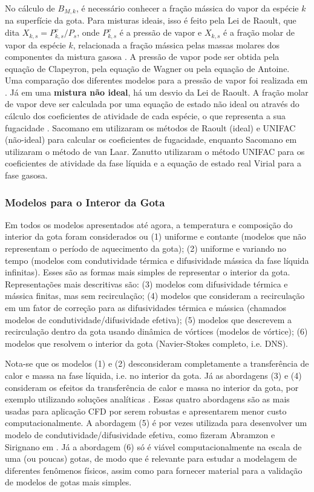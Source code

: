 No cálculo de $B_{M,k}$, é necessário conhecer a fração mássica do vapor da espécie $k$ na superfície da gota.
Para misturas ideais, isso é feito pela Lei de Raoult, que dita $X_{k,s}=P^v_{k,s}/P_s$, onde $P^v_{k,s}$ é a pressão de vapor e $X_{k,s}$ é a fração molar de vapor da espécie $k$, relacionada a fração mássica pelas massas molares dos componentes da mistura gasosa \cite{Peters2010}.
A pressão de vapor pode ser obtida pela equação de Clapeyron, pela equação de Wagner ou pela equação de Antoine.
Uma comparação dos diferentes modelos para a pressão de vapor foi realizada em \cite{SacomanoF2019IJHMT}.
Já em uma \textbf{mistura não ideal}, há um desvio da Lei de Raoult. 
A fração molar de vapor deve ser calculada por uma equação de estado não ideal ou através do cálculo dos coeficientes de atividade de cada espécie, o que representa a sua fugacidade \cite{Bird2002}.
Sacomano\etal{} em \cite{SacomanoF2022IJHMT} utilizaram os métodos de Raoult (ideal) e UNIFAC (não-ideal) para calcular os coeficientes de fugacidade, enquanto Sacomano\etal{} em \cite{SacomanoF2025CF} utilizaram o método de van Laar.
Zanutto\etal{} \cite{ZanuttoC2019} utilizaram o método UNIFAC para os coeficientes de atividade da fase líquida e a equação de estado real Virial para a fase gasosa.
\subsubsection{Modelos para o Interor da Gota} \label{sec:int}

Em todos os modelos apresentados até agora, a temperatura e composição do interior da gota foram considerados ou (1) uniforme e contante (modelos que não representam o período de aquecimento da gota); (2) uniforme e variando no tempo (modelos com condutividade térmica e difusividade mássica da fase líquida infinitas).
Esses são as formas mais simples de representar o interior da gota.
Representações mais descritivas são: (3) modelos com difusividade térmica e mássica finitas, mas sem recirculação; (4) modelos que consideram a recirculação em um fator de correção para as difusividades térmica e mássica (chamados modelos de condutividade/difusividade efetiva); (5) modelos que descrevem a recirculação dentro da gota usando dinâmica de vórtices (modelos de vórtice); (6) modelos que resolvem o interior da gota (Navier-Stokes completo, i.e. DNS). \cite{Sazhin2006}

Nota-se que os modelos (1) e (2) desconsideram completamente a transferência de calor e massa na fase líquida, i.e. no interior da gota.
Já as abordagens (3) e (4) consideram os efeitos da transferência de calor e massa no interior da gota, por exemplo utilizando soluções analíticas \cite{ZanuttoC2019}.
Essas quatro abordagens são as mais usadas para aplicação CFD por serem robustas e apresentarem menor custo computacionalmente. 
A abordagem (5) é por vezes utilizada para desenvolver um modelo de condutividade/difusividade efetiva, como fizeram Abramzon e Sirignano em \cite{Sirignano1989}.
Já a abordagem (6) só é viável computacionalmente na escala de uma (ou poucas) gotas, de modo que é relevante para estudar a modelagem de diferentes fenômenos físicos, assim como para fornecer material para a validação de modelos de gotas mais simples.



